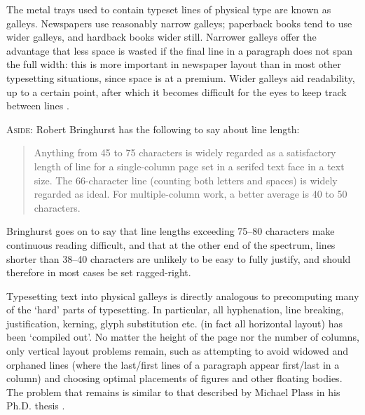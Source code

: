 The metal trays used to contain typeset lines of physical type are known as \glspl{galley}. Newspapers use reasonably narrow galleys; paperback books tend to use wider galleys, and hardback books wider still. Narrower galleys offer the advantage that less space is wasted if the final line in a paragraph does not span the full width: this is more important in newspaper layout than in most other typesetting situations, since space is at a premium. Wider galleys aid readability, up to a certain point, after which it becomes difficult for the eyes to keep track between lines \cite{Bringhurst2008, Voorhees2011}.

\begin{framed}
{ \footnotesize \parindent0pt
\textsc{Aside:} Robert Bringhurst \cite{Bringhurst2008} has the following to say about line length:

\begin{quotation}\noindent
Anything from 45 to 75 characters is widely regarded as a satisfactory length of line for a single-column page set in a serifed text face in a text size. The 66-character line (counting both letters and spaces) is widely regarded as ideal. For multiple-column work, a better average is  40 to 50 characters.
\end{quotation}

Bringhurst goes on to say that line lengths exceeding 75--80 characters make continuous reading difficult, and that at the other end of the spectrum, lines shorter than 38--40 characters are unlikely to be easy to fully justify, and should therefore in most cases be set ragged-right.
}
\end{framed}

Typesetting text into physical galleys is directly analogous to precomputing many of the `hard' parts of typesetting. In particular, all hyphenation, line breaking, justification, kerning, glyph substitution etc. (in fact all horizontal layout) has been `compiled out'. No matter the height of the page nor the number of columns, only vertical layout problems remain, such as attempting to avoid widowed and orphaned lines (where the last/first lines of a paragraph appear first/last in a column) and choosing optimal placements of figures and other floating bodies. The problem that remains is similar to that described by Michael Plass in his Ph.D. thesis \cite{Plass1981}.


